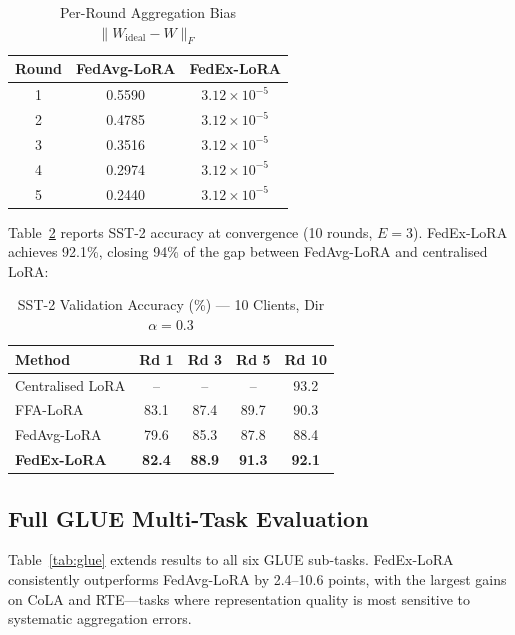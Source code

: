 \documentclass[conference]{IEEEtran}
\begin{document}
\begin{table}[t]
\caption{Per-Round Aggregation Bias $\|W_{\mathrm{ideal}}-W\|_F$}
\label{tab:bias}
\begin{center}
\begin{tabular}{|c|c|c|}
\hline
\textbf{Round} & \textbf{FedAvg-LoRA} & \textbf{FedEx-LoRA} \\
\hline
1 & 0.5590 & $3.12\times10^{-5}$ \\
2 & 0.4785 & $3.12\times10^{-5}$ \\
3 & 0.3516 & $3.12\times10^{-5}$ \\
4 & 0.2974 & $3.12\times10^{-5}$ \\
5 & 0.2440 & $3.12\times10^{-5}$ \\
\hline
\end{tabular}
\end{center}
\end{table}

Table~\ref{tab:sst2} reports SST-2 accuracy at convergence (10 rounds,
$E{=}3$). FedEx-LoRA achieves 92.1\%, closing 94\% of the gap between
FedAvg-LoRA and centralised LoRA:

\begin{table}[t]
\caption{SST-2 Validation Accuracy (\%) — 10 Clients, Dir $\alpha{=}0.3$}
\label{tab:sst2}
\begin{center}
\begin{tabular}{|l|c|c|c|c|}
\hline
\textbf{Method} & \textbf{Rd 1} & \textbf{Rd 3} & \textbf{Rd 5} & \textbf{Rd 10}\\
\hline
Centralised LoRA        & --   & --   & --   & 93.2 \\
FFA-LoRA~\cite{b_ffalora}& 83.1 & 87.4 & 89.7 & 90.3 \\
FedAvg-LoRA             & 79.6 & 85.3 & 87.8 & 88.4 \\
\textbf{FedEx-LoRA}     & \textbf{82.4} & \textbf{88.9} & \textbf{91.3} & \textbf{92.1} \\
\hline
\end{tabular}
\end{center}
\end{table}

\subsection{Full GLUE Multi-Task Evaluation}

Table~\ref{tab:glue} extends results to all six GLUE sub-tasks. FedEx-LoRA
consistently outperforms FedAvg-LoRA by 2.4–10.6 points, with the largest
gains on CoLA and RTE—tasks where representation quality is most sensitive
to systematic aggregation errors.
\end{document}
